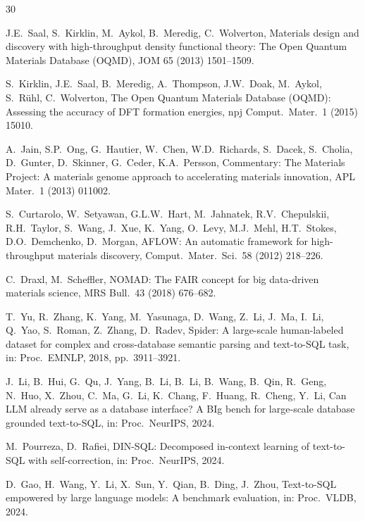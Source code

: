 \documentclass[5p,twocolumn]{elsarticle}
\begin{document}
\begin{thebibliography}{30}

J.E.~Saal, S.~Kirklin, M.~Aykol, B.~Meredig, C.~Wolverton,
Materials design and discovery with high-throughput density functional theory: {The Open Quantum Materials Database (OQMD)},
JOM 65 (2013) 1501--1509.

S.~Kirklin, J.E.~Saal, B.~Meredig, A.~Thompson, J.W.~Doak, M.~Aykol, S.~R\"uhl, C.~Wolverton,
The {Open Quantum Materials Database (OQMD)}: Assessing the accuracy of {DFT} formation energies,
npj Comput.\ Mater.\ 1 (2015) 15010.

A.~Jain, S.P.~Ong, G.~Hautier, W.~Chen, W.D.~Richards, S.~Dacek, S.~Cholia, D.~Gunter, D.~Skinner, G.~Ceder, K.A.~Persson,
Commentary: {The Materials Project}: A materials genome approach to accelerating materials innovation,
APL Mater.\ 1 (2013) 011002.

S.~Curtarolo, W.~Setyawan, G.L.W.~Hart, M.~Jahnatek, R.V.~Chepulskii, R.H.~Taylor, S.~Wang, J.~Xue, K.~Yang, O.~Levy, M.J.~Mehl, H.T.~Stokes, D.O.~Demchenko, D.~Morgan,
{AFLOW}: An automatic framework for high-throughput materials discovery,
Comput.\ Mater.\ Sci.\ 58 (2012) 218--226.

C.~Draxl, M.~Scheffler,
{NOMAD}: {The FAIR} concept for big data-driven materials science,
MRS Bull.\ 43 (2018) 676--682.

T.~Yu, R.~Zhang, K.~Yang, M.~Yasunaga, D.~Wang, Z.~Li, J.~Ma, I.~Li, Q.~Yao, S.~Roman, Z.~Zhang, D.~Radev,
Spider: A large-scale human-labeled dataset for complex and cross-database semantic parsing and text-to-SQL task,
in: Proc.\ EMNLP, 2018, pp.~3911--3921.

J.~Li, B.~Hui, G.~Qu, J.~Yang, B.~Li, B.~Li, B.~Wang, B.~Qin, R.~Geng, N.~Huo, X.~Zhou, C.~Ma, G.~Li, K.~Chang, F.~Huang, R.~Cheng, Y.~Li,
Can LLM already serve as a database interface? A BIg bench for large-scale database grounded text-to-SQL,
in: Proc.\ NeurIPS, 2024.

M.~Pourreza, D.~Rafiei,
DIN-SQL: Decomposed in-context learning of text-to-SQL with self-correction,
in: Proc.\ NeurIPS, 2024.

D.~Gao, H.~Wang, Y.~Li, X.~Sun, Y.~Qian, B.~Ding, J.~Zhou,
Text-to-SQL empowered by large language models: A benchmark evaluation,
in: Proc.\ VLDB, 2024.


\end{thebibliography}
\end{document}
